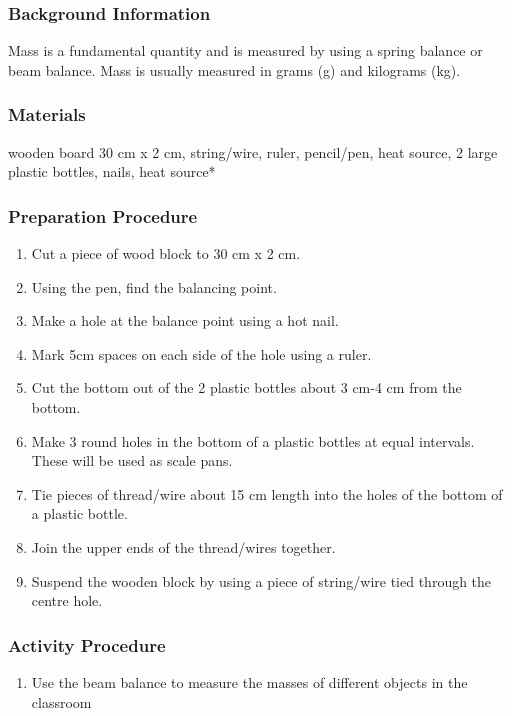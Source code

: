 \subsubsection*{Background Information}
Mass is a fundamental quantity and is measured by using a spring balance or beam balance.  Mass is usually measured in grams (g) and kilograms (kg).

\subsubsection*{Materials}
wooden board 30 cm x 2 cm, string/wire, ruler, pencil/pen, heat source, 2 large plastic bottles, nails, heat source*

\subsubsection*{Preparation Procedure}
\begin{enumerate}
\item{Cut a piece of wood block to 30 cm x 2 cm.} 
\item{Using the pen, find the balancing point.} 
\item{Make a hole at the balance point using a hot nail.} 
\item{Mark 5cm spaces on each side of the hole using a ruler.} 
\item{Cut the bottom out of the 2 plastic bottles about 3 cm-4 cm from the bottom.} 
\item{Make 3 round holes in the bottom of a plastic bottles at equal intervals. These will be used as scale pans.} 
\item{Tie pieces of thread/wire about 15 cm length into the holes of the bottom of a plastic bottle.} 
\item{Join the upper ends of the thread/wires together.} 
\item{Suspend the wooden block by using a piece of string/wire tied through the centre hole.} 
\end{enumerate}

\subsubsection*{Activity Procedure}
\begin{enumerate}
\item{Use the beam balance to measure the masses of different objects in the classroom}
\end{enumerate}

